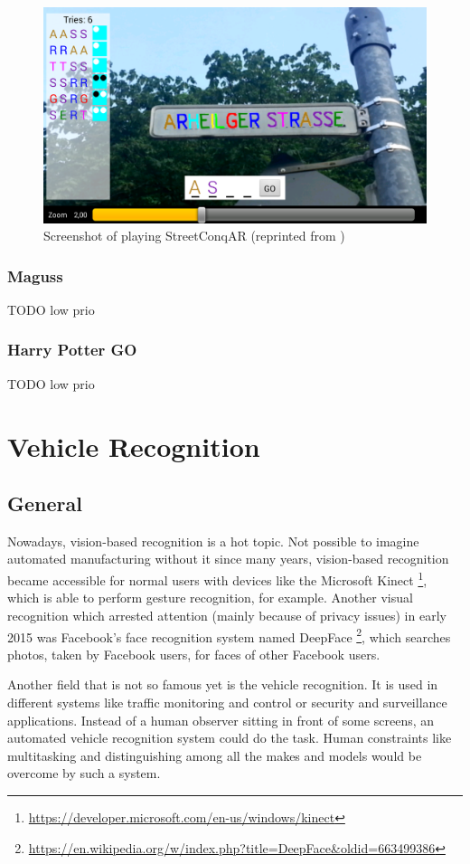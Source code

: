 \begin{figure}[bth]
  \centering
        \includegraphics[width=.65\linewidth]{gfx/streetconqar_gameplay_reprint}
        \caption{Screenshot of playing StreetConqAR (reprinted from \citep{hock2014augmented})}
        \label{fig:streetConqARGameplay}
\end{figure}

\subsubsection{Maguss}
TODO low prio

\subsubsection{Harry Potter GO}
TODO low prio


\section{Vehicle Recognition}

\subsection{General}
Nowadays, vision-based recognition is a hot topic. Not possible to imagine automated manufacturing without it since many years, vision-based recognition became accessible for normal users with devices like the Microsoft Kinect \footnote{\url{https://developer.microsoft.com/en-us/windows/kinect}}, which is able to perform gesture recognition, for example. Another visual recognition which arrested attention (mainly because of privacy issues) in early 2015 was Facebook's face recognition system named DeepFace \footnote{\url{https://en.wikipedia.org/w/index.php?title=DeepFace&oldid=663499386}}, which searches photos, taken by Facebook users, for faces of other Facebook users.

Another field that is not so famous yet is the vehicle recognition. It is used in different systems like traffic monitoring and control or security and surveillance applications. Instead of a human observer sitting in front of some screens, an automated vehicle recognition system could do the task. Human constraints like multitasking and distinguishing among all the makes and models would be overcome by such a system.

